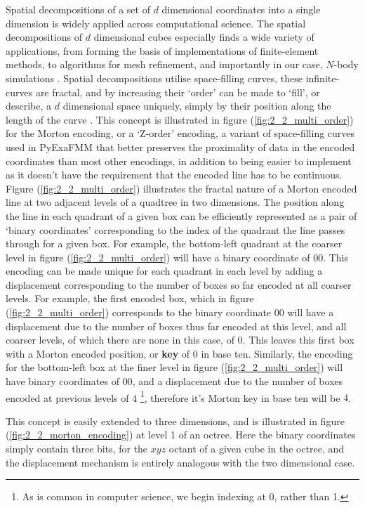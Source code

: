 Spatial decompositions of a set of $d$ dimensional coordinates into a single
dimension is widely applied across computational science. The spatial
decompositions of $d$ dimensional cubes especially finds a wide variety of applications,
from forming the basis of implementations of finite-element methods, to algorithms
for mesh refinement, and importantly in our case, $N$-body simulations
\cite{Sundar:2008:SIAM}. Spatial decompositions utilise space-filling curves,
these infinite-curves are fractal, and by increasing their `order' can be made
to `fill', or describe, a $d$ dimensional space uniquely, simply by their position
along the length of the curve \cite{Campbell:2003:Williams}. This concept is
illustrated in figure (\ref{fig:2_2_multi_order}) for the Morton encoding, or a
`Z-order' encoding, a variant of space-filling curves used in \gls{PyExaFMM}
that better preserves the proximality of data in the encoded coordinates than
 most other encodings, in addition to being easier to implement as it doesn't
 have the requirement that the encoded line has to be continuous.
 Figure (\ref{fig:2_2_multi_order}) illustrates the fractal nature of a Morton
 encoded line at two adjacent levels of a quadtree in two dimensions. The
 position along the line in each quadrant of a given box can be efficiently represented as a pair of `binary coordinates'
 corresponding to the index of the quadrant the line passes through for a given box.
 For example, the bottom-left quadrant at the coarser level in figure (\ref{fig:2_2_multi_order})
 will have a binary coordinate of $00$. This encoding can be made unique for each
 quadrant in each level by adding a displacement corresponding to the number of boxes so far
 encoded at all coarser levels. For example, the first encoded box, which in figure (\ref{fig:2_2_multi_order})
 corresponds to the binary coordinate $00$ will have a displacement due to the
 number of boxes thus far encoded at this level, and all coarser levels, of which
 there are none in this case, of 0. This leaves this first box with a Morton encoded position,
 or \textbf{\gls{key}} of 0 in base ten. Similarly, the encoding for the bottom-left box at the finer
 level in figure (\ref{fig:2_2_multi_order}) will have binary coordinates of $00$,
 and a displacement due to the number of boxes encoded at previous levels of 4
 \footnote{As is common in computer science, we begin indexing at 0, rather than 1.},
therefore it's Morton \gls{key} in base ten will be $4$.

This concept is easily extended to three dimensions, and is illustrated in
figure (\ref{fig:2_2_morton_encoding}) at level 1 of an octree. Here the binary
coordinates simply contain three bits, for the $xyz$ octant of a given cube
in the octree, and the displacement mechanism is entirely analogous with the
two dimensional case.

